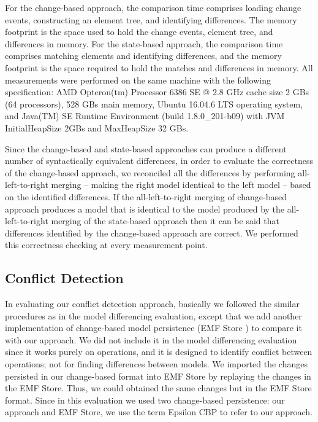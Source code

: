 For the change-based approach, the comparison time comprises loading change events, constructing an element tree, and identifying differences. The memory footprint is the space used to hold the change events, element tree, and differences in memory. For the state-based approach, the comparison time comprises matching elements and identifying differences, and the memory footprint is the space required to hold the matches and differences in memory. All measurements were performed on the same machine with the following specification: AMD Opteron(tm) Processor 6386 SE @ 2.8 GHz cache size 2 GBs (64 processors), 528 GBs main memory, Ubuntu 16.04.6 LTS operating system, and Java(TM) SE Runtime Environment (build 1.8.0\_201-b09) with JVM \textsf{InitialHeapSize} 2GBs and \textsf{MaxHeapSize} 32 GBs.

Since the change-based and state-based approaches can produce a different number of syntactically equivalent differences, in order to evaluate the correctness of the change-based approach, we reconciled all the differences by performing all-left-to-right merging -- making the right model identical to the left model -- based on the identified differences. If the all-left-to-right merging of change-based approach produces a model that is identical to the model produced by the all-left-to-right merging of the state-based approach then it can be said that differences identified by the change-based approach are correct. We performed this correctness checking at every measurement point.

\subsection{Conflict Detection}
\label{sec:conflict_detection_evaluation}
In evaluating our conflict detection approach, basically we followed the similar procedures as in the model differencing evaluation, except that we add another implementation of change-based model persistence (EMF Store \cite{koegel2010emfstore}) to compare it with our approach. We did not include it in the model differencing evaluation since it works purely on operations, and it is designed to identify conflict between operations; not for finding differences between models. We imported the changes persisted in our change-based format into EMF Store by replaying the changes in the EMF Store. Thus, we could obtained the same changes but in the EMF Store format. Since in this evaluation we used two change-based persistence: our approach and EMF Store, we use the term Epsilon CBP to refer to our approach.

